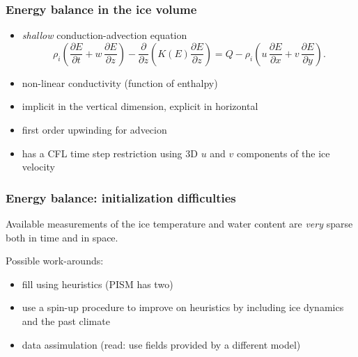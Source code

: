 \documentclass[hide notes,intlimits]{beamer}
\newcommand{\diff}[2]{\frac{\partial #1}{\partial #2}}
\begin{document}
\begin{frame}
  \frametitle{Energy balance in the ice volume}
  \begin{itemize}
  \item \emph{shallow} conduction-advection equation
    \begin{equation*}
      \label{eq:1}
      \rho_{i} \left( \diff{E}{t} + w\,\diff{E}{z} \right) - \diff{}{z}\left( K(E) \diff{E}{z} \right) = Q - \rho_{i} \left( u\,\diff{E}{x} + v\,\diff{E}{y} \right).
    \end{equation*}
  \item non-linear conductivity (function of enthalpy)
  \item implicit in the vertical dimension, explicit in horizontal
  \item first order upwinding for advecion
  \item has a CFL time step restriction using 3D $u$ and $v$
    components of the ice velocity
  \end{itemize}
\end{frame}

\begin{frame}
  \frametitle{Energy balance: initialization difficulties}

  Available measurements of the ice temperature and water content are
  \emph{very} sparse both in time and in space.

  \medskip
  Possible work-arounds:
  \begin{itemize}
  \item fill using heuristics (PISM has two)
  \item use a spin-up procedure to improve on heuristics by including
    ice dynamics and the past climate
  \item data assimulation (read: use fields provided by a different
    model)
  \end{itemize}
\end{frame}

\end{document}
